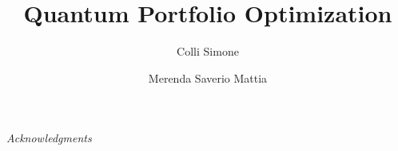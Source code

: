 \documentclass{article}
\author[1]{Colli Simone}
\author[1]{Merenda Saverio Mattia}
\affil[1]{
    \url{simone.colli@studenti.unipr.it}
    }
\affil[2]{
    \url{saveriomattia.merenda@studenti.unipr.it}
    }
\title{Quantum Portfolio Optimization}
\begin{document}
\maketitle










\textit{Acknowledgments} \\

\hfill

\break
\printbibliography
\end{document}
